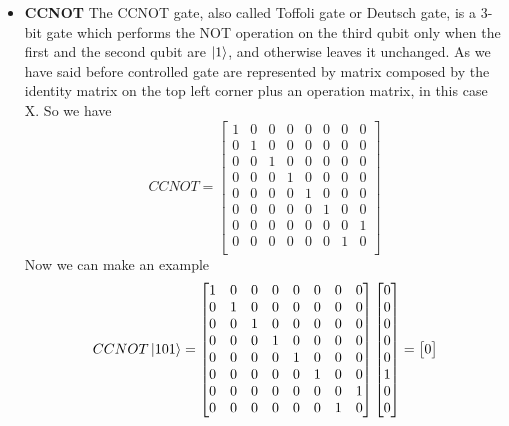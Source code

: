 \documentclass[main.tex]{subfiles}
\begin{document}
\begin{itemize}
	\item \textbf{CCNOT} The CCNOT gate, also called Toffoli gate or Deutsch gate, is a 3-bit gate
	which performs the NOT operation on the third qubit only when the first and the second qubit are
	$\ket{1}$, and otherwise leaves it unchanged. As we have said before controlled gate are represented 
	by matrix composed by the identity matrix on the top left corner plus an operation matrix, in this 
	case X. So we have
	\begin{equation}
	CCNOT=
	\begin{bmatrix}
	1 & 0 & 0 & 0 & 0 & 0 & 0 & 0\\
	0 & 1 & 0 & 0 & 0 & 0 & 0 & 0\\
	0 & 0 & 1 & 0 & 0 & 0 & 0 & 0\\
	0 & 0 & 0 & 1 & 0 & 0 & 0 & 0\\
	0 & 0 & 0 & 0 & 1 & 0 & 0 & 0\\
	0 & 0 & 0 & 0 & 0 & 1 & 0 & 0\\
	0 & 0 & 0 & 0 & 0 & 0 & 0 & 1\\
	0 & 0 & 0 & 0 & 0 & 0 & 1 & 0\\
	\end{bmatrix}
	\end{equation}
	Now we can make an example	 
	$$
	CCNOT\ket{101}=
	\begin{bmatrix}
	1 & 0 & 0 & 0 & 0 & 0 & 0 & 0\\
	0 & 1 & 0 & 0 & 0 & 0 & 0 & 0\\
	0 & 0 & 1 & 0 & 0 & 0 & 0 & 0\\
	0 & 0 & 0 & 1 & 0 & 0 & 0 & 0\\
	0 & 0 & 0 & 0 & 1 & 0 & 0 & 0\\
	0 & 0 & 0 & 0 & 0 & 1 & 0 & 0\\
	0 & 0 & 0 & 0 & 0 & 0 & 0 & 1\\
	0 & 0 & 0 & 0 & 0 & 0 & 1 & 0\\
	\end{bmatrix}
	\begin{bmatrix}
	0\\
	0\\
	0\\
	0\\
	0\\
	1\\
	0\\
	0\\
	\end{bmatrix}
	=
	\begin{bmatrix}
	0\\

\end{bmatrix}$$
\end{itemize}
\end{document}
